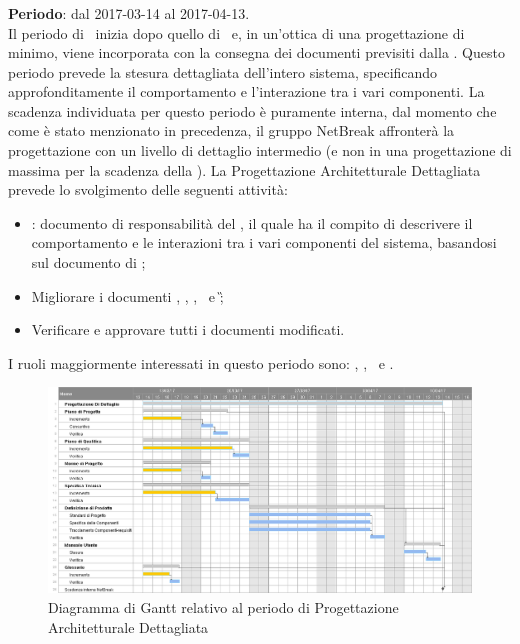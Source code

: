 	
		\subsubsection{\PD}
		\textbf{Periodo}: dal 2017-03-14 al 2017-04-13.\\
		Il periodo di \PD\ inizia dopo quello di \PA\ e, in un'ottica di una progettazione di minimo, viene incorporata con la consegna dei documenti previsiti dalla \RQ. Questo periodo prevede la stesura dettagliata dell’intero sistema, specificando approfonditamente il comportamento e l’interazione tra i vari componenti. La scadenza individuata per questo periodo è puramente interna, dal momento che come è stato menzionato in precedenza, il gruppo NetBreak affronterà la progettazione con un livello di dettaglio intermedio (e non in una progettazione di massima per la scadenza della \RP).
		La Progettazione Architetturale Dettagliata prevede lo svolgimento delle seguenti attività:
		\begin{itemize}
			\item \textit{\DDP}: documento di responsabilità del \textit{\Prog}, il quale ha il compito di descrivere il comportamento	e le interazioni tra i vari componenti del sistema, basandosi sul documento di \ST;
			\item  Migliorare i documenti \NdP, \PdP, \PdQ, \ST\ e \G;
			\item Verificare e approvare tutti i documenti modificati.
		\end{itemize}
		I ruoli maggiormente interessati in questo periodo sono: \textit{\Amm}, \textit{\Res}, \textit{\Prog}\ e \textit{\Ver}.
		
		\begin{figure}[H]
			\centering
			\includegraphics[scale=0.43]{img/ganttnetbreak4.png}
			\caption{Diagramma di Gantt relativo al periodo di Progettazione Architetturale Dettagliata}
		\end{figure}
		
